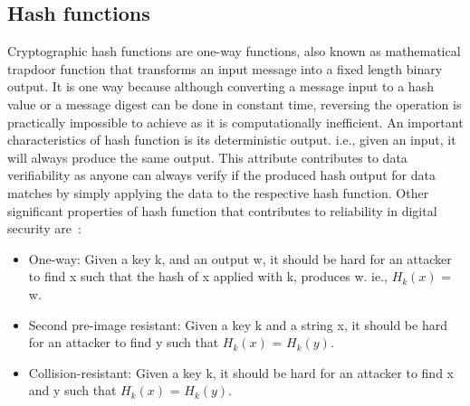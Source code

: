 
\subsection{Hash functions}
Cryptographic hash functions are one-way functions, also known as mathematical
trapdoor function that transforms an input message into a fixed length binary
output. It is one way because although converting a message input to a hash
value or a message digest can be done in constant time, reversing the operation
is practically impossible to achieve as it is computationally inefficient. An
important characteristics of hash function is its deterministic output. i.e.,
given an input, it will always produce the same output. This attribute
contributes to data verifiability as anyone can always verify if the produced
hash output for data matches by simply applying the data to the respective hash
function. 
Other significant properties of hash function that contributes to
reliability in digital security are~\cite{mironov2005hash}: \\
\begin{itemize}
	\item One-way: Given a key k, and an output w, it should be hard for an
		attacker to find x such that the hash of x applied with k, produces w.
		ie., $H_k(x)$ = w.\\ 
	\item Second pre-image resistant: Given a key k and a string x, it should
		be hard for an attacker to find y such that $H_k(x)$ = $H_k(y)$.\\ 
	\item Collision-resistant: Given a key k, it should be hard for an attacker
		to find x and y such that $H_k(x)$ = $H_k(y)$. \\
\end{itemize}
